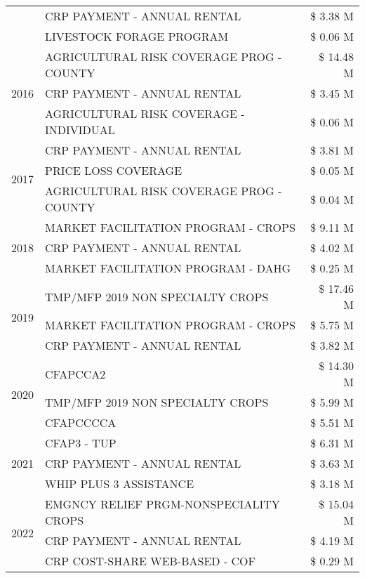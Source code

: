 \begin{tabular}{llr}
 & CRP PAYMENT - ANNUAL RENTAL & \$ 3.38 M \\
 & LIVESTOCK FORAGE PROGRAM & \$ 0.06 M \\
\cline{1-3}
\multirow[t]{3}{*}{2016} & AGRICULTURAL RISK COVERAGE PROG - COUNTY & \$ 14.48 M \\
 & CRP PAYMENT - ANNUAL RENTAL & \$ 3.45 M \\
 & AGRICULTURAL RISK COVERAGE - INDIVIDUAL & \$ 0.06 M \\
\cline{1-3}
\multirow[t]{3}{*}{2017} & CRP PAYMENT - ANNUAL RENTAL & \$ 3.81 M \\
 & PRICE LOSS COVERAGE & \$ 0.05 M \\
 & AGRICULTURAL RISK COVERAGE PROG - COUNTY & \$ 0.04 M \\
\cline{1-3}
\multirow[t]{3}{*}{2018} & MARKET FACILITATION PROGRAM - CROPS & \$ 9.11 M \\
 & CRP PAYMENT - ANNUAL RENTAL & \$ 4.02 M \\
 & MARKET FACILITATION PROGRAM - DAHG & \$ 0.25 M \\
\cline{1-3}
\multirow[t]{3}{*}{2019} & TMP/MFP 2019 NON SPECIALTY CROPS & \$ 17.46 M \\
 & MARKET FACILITATION PROGRAM - CROPS & \$ 5.75 M \\
 & CRP PAYMENT - ANNUAL RENTAL & \$ 3.82 M \\
\cline{1-3}
\multirow[t]{3}{*}{2020} & CFAPCCA2 & \$ 14.30 M \\
 & TMP/MFP 2019 NON SPECIALTY CROPS & \$ 5.99 M \\
 & CFAPCCCCA & \$ 5.51 M \\
\cline{1-3}
\multirow[t]{3}{*}{2021} & CFAP3 - TUP & \$ 6.31 M \\
 & CRP PAYMENT - ANNUAL RENTAL & \$ 3.63 M \\
 & WHIP PLUS 3 ASSISTANCE & \$ 3.18 M \\
\cline{1-3}
\multirow[t]{3}{*}{2022} & EMGNCY RELIEF PRGM-NONSPECIALITY CROPS & \$ 15.04 M \\
 & CRP PAYMENT - ANNUAL RENTAL & \$ 4.19 M \\
 & CRP COST-SHARE WEB-BASED - COF & \$ 0.29 M \\
\cline{1-3}
\bottomrule
\end{tabular}
